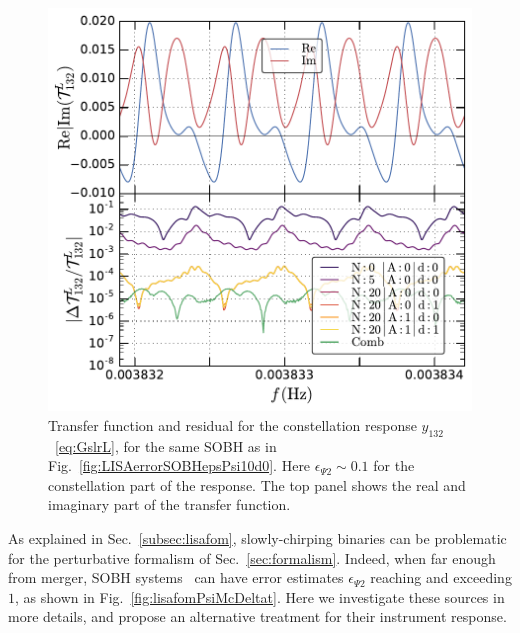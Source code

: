 \documentclass[aps,showpacs,twocolumn,
prd,superscriptaddress,nofootinbib]{revtex4-1}
\begin{document}
\begin{figure}
  \centering
  \includegraphics[width=.98\linewidth]{plots/LISAtransfererrorSOBHepsPsi10y12L_py.pdf}
  \caption{Transfer function and residual for the constellation response $y_{132}$~\eqref{eq:GslrL}, for the same SOBH as in Fig.~\ref{fig:LISAerrorSOBHepsPsi10d0}. Here $\epsilon_{\Psi 2}\sim 0.1$ for the constellation part of the response. The top panel shows the real and imaginary part of the transfer function.}
  \label{fig:LISAerrorSOBHepsPsi10const}
\end{figure}

As explained in Sec.~\ref{subsec:lisafom}, slowly-chirping binaries can be problematic for the perturbative formalism of Sec.~\ref{sec:formalism}. Indeed, when far enough from merger, SOBH systems~\cite{Sesana16} can have error estimates $\epsilon_{\Psi 2}$ reaching and exceeding $1$, as shown in Fig.~\ref{fig:lisafomPsiMcDeltat}. Here we investigate these sources in more details, and propose an alternative treatment for their instrument response.
\end{document}
